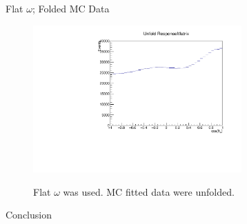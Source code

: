 \documentclass[
		10pt
		]{beamer}
\begin{document}
\fi

\begin{frame}{Flat $\omega$; Folded MC Data}
	\begin{figure}
		\includegraphics[width=8cm]{Plots/FlatMC.pdf}\\
		\captionsetup{labelformat=empty}
		\caption{Flat $\omega$ was used. MC fitted data were unfolded.}
	\end{figure}
\end{frame}

\begin{frame}{Conclusion}
	
	
	
\end{frame}
\end{document}
